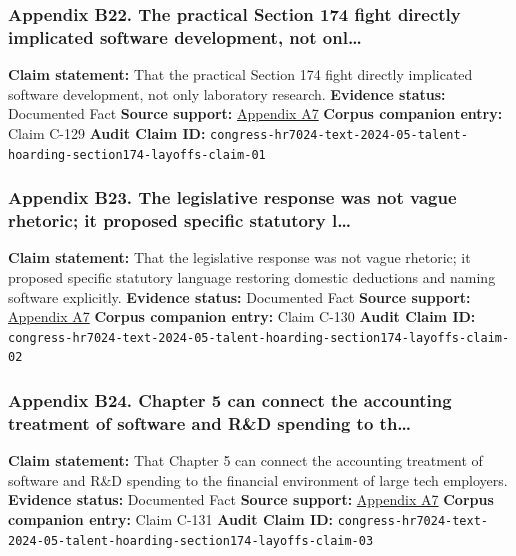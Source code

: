\documentclass[
  american,
  11pt,
  letterpaper,
]{article}
\begin{document}
\subsubsection{Appendix B22. The practical Section 174 fight directly
implicated software development, not
onl\ldots{}}\label{appendix-b22-the-practical-section-174-fight-directly-implicated-software-development-not-onl}

\textbf{Claim statement:} That the practical Section 174 fight directly
implicated software development, not only laboratory research.
\textbf{Evidence status:} Documented Fact \textbf{Source support:}
\hyperref[appendix-a7-h-r-7024-text-deduction-for-domestic-research-and-experimental-expenditures]{Appendix
A7} \textbf{Corpus companion entry:} Claim C-129 \textbf{Audit Claim
ID:}
\texttt{congress-hr7024-text-2024-05-talent-hoarding-section174-layoffs-claim-01}

\subsubsection{Appendix B23. The legislative response was not vague
rhetoric; it proposed specific statutory
l\ldots{}}\label{appendix-b23-the-legislative-response-was-not-vague-rhetoric-it-proposed-specific-statutory-l}

\textbf{Claim statement:} That the legislative response was not vague
rhetoric; it proposed specific statutory language restoring domestic
deductions and naming software explicitly. \textbf{Evidence status:}
Documented Fact \textbf{Source support:}
\hyperref[appendix-a7-h-r-7024-text-deduction-for-domestic-research-and-experimental-expenditures]{Appendix
A7} \textbf{Corpus companion entry:} Claim C-130 \textbf{Audit Claim
ID:}
\texttt{congress-hr7024-text-2024-05-talent-hoarding-section174-layoffs-claim-02}

\subsubsection{Appendix B24. Chapter 5 can connect the accounting
treatment of software and R\&D spending to
th\ldots{}}\label{appendix-b24-chapter-5-can-connect-the-accounting-treatment-of-software-and-r-d-spending-to-th}

\textbf{Claim statement:} That Chapter 5 can connect the accounting
treatment of software and R\&D spending to the financial environment of
large tech employers. \textbf{Evidence status:} Documented Fact
\textbf{Source support:}
\hyperref[appendix-a7-h-r-7024-text-deduction-for-domestic-research-and-experimental-expenditures]{Appendix
A7} \textbf{Corpus companion entry:} Claim C-131 \textbf{Audit Claim
ID:}
\texttt{congress-hr7024-text-2024-05-talent-hoarding-section174-layoffs-claim-03}
\end{document}
